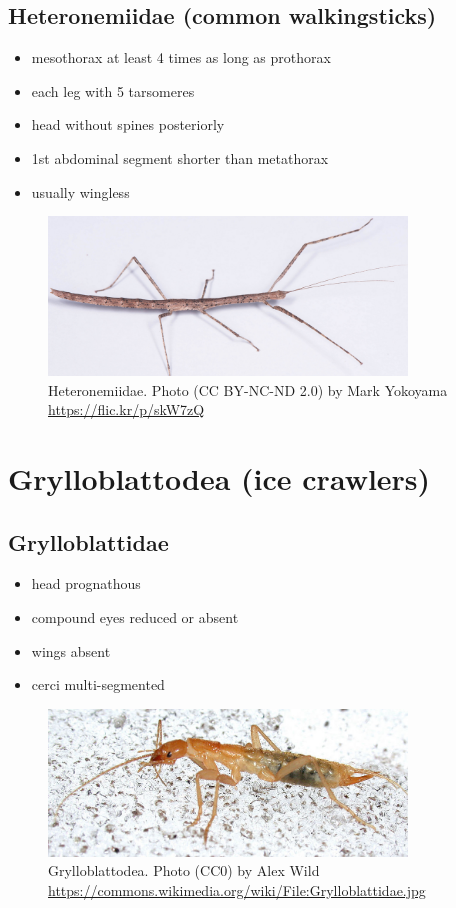\documentclass[letterpaper, 11pt]{article}
\begin{document}
\subsection*{Heteronemiidae (common walkingsticks)}
\begin{itemize}
\item mesothorax at least 4 times as long as prothorax
\item each leg with 5 tarsomeres
\item head without spines posteriorly
\item 1st abdominal segment shorter than metathorax
\item usually wingless
\end{itemize}

\begin{figure}[ht!]
  \centering
    \includegraphics[width=0.85\textwidth]{phasma}
  \caption{Heteronemiidae. Photo (CC BY-NC-ND 2.0) by Mark Yokoyama \url{https://flic.kr/p/skW7zQ}}
  \label{fig:heteronemiid}
\end{figure}

\section{Grylloblattodea (ice crawlers)}
\subsection*{Grylloblattidae}
\begin{itemize}
\item head prognathous
\item compound eyes reduced or absent
\item wings absent
\item cerci multi-segmented
\end{itemize}

\begin{figure}[ht!]
  \centering
    \includegraphics[width=0.85\textwidth]{grylloblattidae}
  \caption{Grylloblattodea. Photo (CC0) by Alex Wild \url{https://commons.wikimedia.org/wiki/File:Grylloblattidae.jpg}}
  \label{fig:grylloblatt}
\end{figure}
\end{document}
